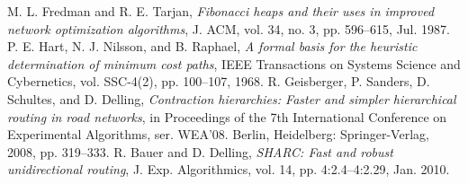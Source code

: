 \documentclass[conference]{IEEEtran}
\begin{document}
\begin{thebibliography}{99}
 M. L. Fredman and R. E. Tarjan, {\it Fibonacci heaps and their uses in improved network optimization algorithms}, J. ACM, vol. 34, no. 3, pp. 596–615, Jul. 1987.
 P. E. Hart, N. J. Nilsson, and B. Raphael, {\it A formal basis for the heuristic determination of minimum cost paths}, IEEE Transactions on Systems Science and Cybernetics, vol. SSC-4(2), pp. 100–107, 1968.
 R. Geisberger, P. Sanders, D. Schultes, and D. Delling, {\it Contraction hierarchies: Faster and simpler hierarchical routing in road networks}, in Proceedings of the 7th International Conference on Experimental Algorithms, ser. WEA’08. Berlin, Heidelberg: Springer-Verlag, 2008, pp. 319–333.
 R. Bauer and D. Delling, {\it SHARC: Fast and robust unidirectional routing}, J. Exp. Algorithmics, vol. 14, pp. 4:2.4–4:2.29, Jan. 2010.
\end{thebibliography}
\end{document}
